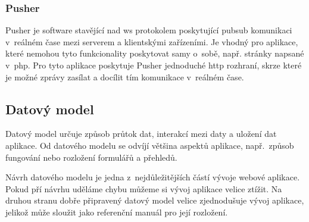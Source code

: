 \subsubsection{Pusher}
\label{subsub:pusher}

Pusher\cite{pusher} je software stavějící nad \acrshort{ws} protokolem poskytující \gls{pubsub} komunikaci v~reálném čase mezi serverem a klientskými zařízeními. Je vhodný pro aplikace, které nemohou tyto funkcionality poskytovat samy o~sobě, např. stránky napsané v~\acrshort{php}. Pro tyto aplikace poskytuje Pusher jednoduché \acrshort{http} rozhraní, skrze které je možné zprávy zasílat a docílit tím komunikace v~reálném čase.

\subsection{Datový model}

Datový model\cite{data-model} určuje způsob průtok dat, interakcí mezi daty a uložení dat aplikace. Od datového modelu se odvíjí většina aspektů aplikace, např.~způsob fungování nebo rozložení formulářů a přehledů.

Návrh datového modelu je jedna z~nejdůležitějších částí vývoje webové aplikace.  Pokud pří návrhu uděláme chybu můžeme si vývoj aplikace velice ztížit. Na druhou stranu dobře připravený datový model velice zjednodušuje vývoj aplikace, jelikož může sloužit jako referenční manuál pro její rozložení.
